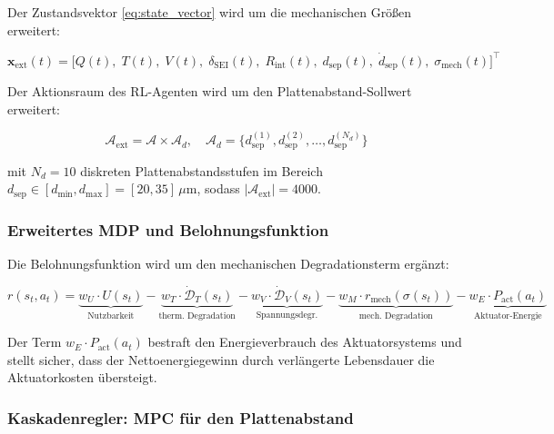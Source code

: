 ﻿\documentclass[12pt,a4paper]{article}
\begin{document}
Der Zustandsvektor \eqref{eq:state_vector} wird um die mechanischen Größen
erweitert:

\begin{equation}
	\mathbf{x}_\mathrm{ext}(t) = \bigl[Q(t),\; T(t),\; V(t),\; \delta_\mathrm{SEI}(t),\;
	R_\mathrm{int}(t),\; d_\mathrm{sep}(t),\; \dot{d}_\mathrm{sep}(t),\;
	\sigma_\mathrm{mech}(t)\bigr]^\top
	\label{eq:state_vector_ext}
\end{equation}

Der Aktionsraum des RL-Agenten wird um den Plattenabstand-Sollwert erweitert:

\begin{equation}
	\mathcal{A}_\mathrm{ext} = \mathcal{A} \times \mathcal{A}_d, \quad
	\mathcal{A}_d = \{d_\mathrm{sep}^{(1)}, d_\mathrm{sep}^{(2)}, \ldots, d_\mathrm{sep}^{(N_d)}\}
	\label{eq:action_space_ext}
\end{equation}

mit $N_d = 10$ diskreten Plattenabstandsstufen im Bereich
$d_\mathrm{sep} \in [d_\mathrm{min}, d_\mathrm{max}] = [20, 35]\,\mu\mathrm{m}$,
sodass $|\mathcal{A}_\mathrm{ext}| = 4000$.

\subsubsection{Erweitertes MDP und Belohnungsfunktion}

Die Belohnungsfunktion wird um den mechanischen Degradationsterm ergänzt:

\begin{equation}
	r(s_t, a_t) = \underbrace{w_U \cdot U(s_t)}_{\text{Nutzbarkeit}}
	- \underbrace{w_T \cdot \dot{\mathcal{D}}_T(s_t)}_{\text{therm.\ Degradation}}
	- \underbrace{w_V \cdot \dot{\mathcal{D}}_V(s_t)}_{\text{Spannungsdegr.}}
	- \underbrace{w_M \cdot r_\mathrm{mech}(\sigma(s_t))}_{\text{mech.\ Degradation}}
	- \underbrace{w_E \cdot P_\mathrm{act}(a_t)}_{\text{Aktuator-Energie}}
	\label{eq:reward_extended}
\end{equation}

Der Term $w_E \cdot P_\mathrm{act}(a_t)$ bestraft den Energieverbrauch des
Aktuatorsystems und stellt sicher, dass der Nettoenergiegewinn durch verlängerte
Lebensdauer die Aktuatorkosten übersteigt.

\subsubsection{Kaskadenregler: MPC für den Plattenabstand}
\end{document}
